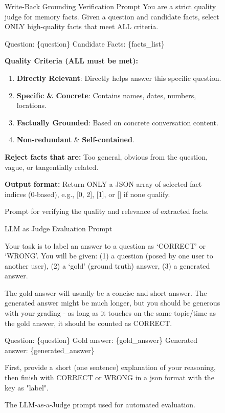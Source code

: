 \documentclass{article}
\theoremstyle{plain}
\theoremstyle{definition}
\theoremstyle{remark}
\begin{document}
\begin{figure}[htb]
\begin{AIbox}[width=\textwidth]{Write-Back Grounding Verification Prompt}
\footnotesize
You are a strict quality judge for memory facts. Given a question and candidate facts, select ONLY high-quality facts that meet ALL criteria.

Question: \{question\} \newline
Candidate Facts: \{facts\_list\}

\textbf{Quality Criteria (ALL must be met):}
\begin{enumerate}
    \item \textbf{Directly Relevant}: Directly helps answer this specific question.
    \item \textbf{Specific \& Concrete}: Contains names, dates, numbers, locations.
    \item \textbf{Factually Grounded}: Based on concrete conversation content.
    \item \textbf{Non-redundant} \& \textbf{Self-contained}.
\end{enumerate}

\textbf{Reject facts that are:} Too general, obvious from the question, vague, or tangentially related.

\textbf{Output format:} Return ONLY a JSON array of selected fact indices (0-based), e.g., [0, 2], [1], or [] if none qualify.
\end{AIbox}
\caption{Prompt for verifying the quality and relevance of extracted facts.}
\label{fig:write_back_prompt}
\end{figure}

\begin{figure}[htb]
\begin{AIbox}[width=\textwidth]{LLM as Judge Evaluation Prompt}
\footnotesize

Your task is to label an answer to a question as `CORRECT' or `WRONG'. 
You will be given:
    (1) a question (posed by one user to another user), 
    (2) a `gold' (ground truth) answer, 
    (3) a generated answer.

The gold answer will usually be a concise and short answer. 
The generated answer might be much longer, but you should be generous 
with your grading - as long as it touches on the same topic/time 
as the gold answer, it should be counted as CORRECT.

Question: \{question\}
Gold answer: \{gold\_answer\}
Generated answer: \{generated\_answer\}

First, provide a short (one sentence) explanation of your reasoning, 
then finish with CORRECT or WRONG in a json format with the key as "label".

\end{AIbox}
\caption{The LLM-as-a-Judge prompt used for automated evaluation.}
\label{fig:llm_judge_prompt}
\end{figure}
\end{document}
